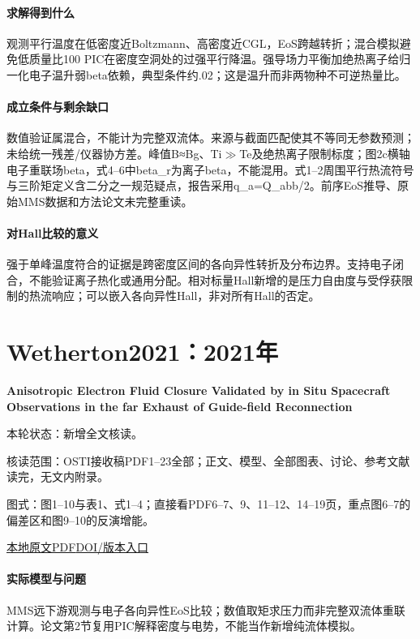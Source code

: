 \paragraph{求解得到什么}观测平行温度在低密度近Boltzmann、高密度近CGL，EoS跨越转折；混合模拟避免低质量比100 PIC在密度空洞处的过强平行降温。强导场力平衡加绝热离子给归一化电子温升弱beta依赖，典型条件约.02；这是温升而非两物种不可逆热量比。

\paragraph{成立条件与剩余缺口}数值验证属混合，不能计为完整双流体。来源与截面匹配使其不等同无参数预测；未给统一残差/仪器协方差。峰值B≈Bg、Ti\ensuremath{\gg}Te及绝热离子限制标度；图2c横轴电子重联场beta，式4–6中beta\_r为离子beta，不能混用。式1–2周围平行热流符号与三阶矩定义含二分之一规范疑点，报告采用q\_a=Q\_abb/2。前序EoS推导、原始MMS数据和方法论文未完整重读。

\paragraph{对Hall比较的意义}强于单峰温度符合的证据是跨密度区间的各向异性转折及分布边界。支持电子闭合，不能验证离子热化或通用分配。相对标量Hall新增的是压力自由度与受俘获限制的热流响应；可以嵌入各向异性Hall，非对所有Hall的否定。

\section{Wetherton2021：2021年}\label{paper:Wetherton2021}

\textbf{Anisotropic Electron Fluid Closure Validated by in Situ Spacecraft Observations in the far Exhaust of Guide-field Reconnection}\citep{Wetherton2021}

\textsf{本轮状态：}新增全文核读。

\textsf{核读范围：}OSTI接收稿PDF1–23全部；正文、模型、全部图表、讨论、参考文献读完，无文内附录。\par\textsf{图式：}图1–10与表1、式1–4；直接看PDF6–7、9、11–12、14–19页，重点图6–7的偏差区和图9–10的反演增能。

\href{run:../../papers/Wetherton2021.pdf}{本地原文PDF}\quad\href{https://doi.org/10.1029/2020JA028604}{DOI/版本入口}

\paragraph{实际模型与问题}MMS远下游观测与电子各向异性EoS比较；数值取矩求压力而非完整双流体重联计算。论文第2节复用PIC解释密度与电势，不能当作新增纯流体模拟。

